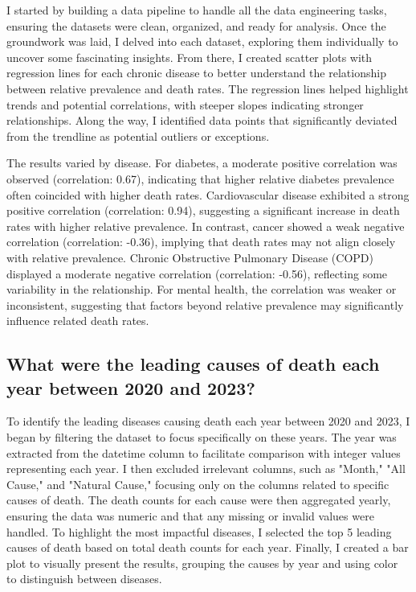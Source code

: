 \documentclass[a4paper,10pt]{article}
\begin{document}
I started by building a data pipeline to handle all the data engineering tasks, ensuring the datasets were clean, organized, and ready for analysis. Once the groundwork was laid, I delved into each dataset, exploring them individually to uncover some fascinating insights. From there, I created scatter plots with regression lines for each chronic disease to better understand the relationship between relative prevalence and death rates. The regression lines helped highlight trends and potential correlations, with steeper slopes indicating stronger relationships. Along the way, I identified data points that significantly deviated from the trendline as potential outliers or exceptions.

The results varied by disease. For diabetes, a moderate positive correlation was observed (correlation: 0.67), indicating that higher relative diabetes prevalence often coincided with higher death rates. Cardiovascular disease exhibited a strong positive correlation (correlation: 0.94), suggesting a significant increase in death rates with higher relative prevalence. In contrast, cancer showed a weak negative correlation (correlation: -0.36), implying that death rates may not align closely with relative prevalence. Chronic Obstructive Pulmonary Disease (COPD) displayed a moderate negative correlation (correlation: -0.56), reflecting some variability in the relationship. For mental health, the correlation was weaker or inconsistent, suggesting that factors beyond relative prevalence may significantly influence related death rates.

\subsection{What were the leading causes of death each year between 2020 and 2023?}

To identify the leading diseases causing death each year between 2020 and 2023, I began by filtering the dataset to focus specifically on these years. The year was extracted from the datetime column to facilitate comparison with integer values representing each year. I then excluded irrelevant columns, such as "Month," "All Cause," and "Natural Cause," focusing only on the columns related to specific causes of death. The death counts for each cause were then aggregated yearly, ensuring the data was numeric and that any missing or invalid values were handled. To highlight the most impactful diseases, I selected the top 5 leading causes of death based on total death counts for each year. Finally, I created a bar plot to visually present the results, grouping the causes by year and using color to distinguish between diseases.
\end{document}
